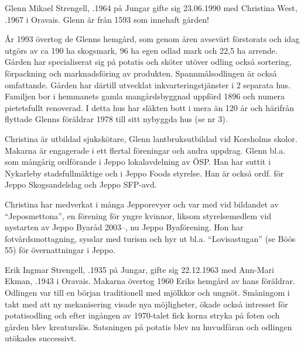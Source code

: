 
Glenn Mikael Strengell, .1964 på Jungar gifte sig 23.06.1990 med Christina West, .1967 i  Oravais. Glenn är  från 1593 som innehaft gården!


År 1993 övertog de Glenns hemgård, som genom åren avsevärt förstorats och idag utgörs av ca 190 ha skogsmark, 96 ha egen odlad mark och 22,5 ha arrende. Gården har specialiserat sig på potatis och sköter utöver odling också sortering, förpackning och marknadsföring av produkten. Spannmålsodlingen är också omfattande. Gården har därtill utvecklat inkvarteringstjänster i 2 separata hus. Familjen bor i hemmanets gamla mangårdsbyggnad uppförd 1896 och numera pietetsfullt renoverad. I detta hus har släkten bott i mera än 120 år och härifrån flyttade Glenns föräldrar 1978 till sitt nybyggda hus (se nr 3).

Christina är utbildad sjukskötare, Glenn lantbruksutbildad vid Korsholms skolor. Makarna är engagerade i ett flertal föreningar och andra uppdrag. Glenn bl.a. som mångårig ordförande i Jeppo lokalavdelning av ÖSP. Han har suttit i Nykarleby stadsfullmäktige och i Jeppo Foods styrelse. Han är också ordf. för Jeppo Skogsandelslag och Jeppo SFP-avd.

Christina har medverkat i många Jepporevyer och var med vid bildandet av ``Jeposmettona'', en förening för yngre kvinnor, liksom styrelsemedlem vid nystarten av Jeppo Byaråd 2003--, nu Jeppo Byaförening. Hon har fotvårdsmottagning, sysslar med turism och hyr ut bl.a. ``Lovisastugan'' (se Böös 55) för övernattningar i Jeppo.
\begin{jhchildren}
  \item {}
  \item {}
  \item {}
  \item {}
\end{jhchildren}


Erik Ingmar Strengell, .1935 på Jungar, gifte sig 22.12.1963 med Ann-Mari Ekman, .1943 i Oravais. Makarna övertog 1960 Eriks hemgård av hans föräldrar. Odlingen var till en början traditionell med mjölkkor och ungnöt. Småningom i takt med att ny mekanisering visade nya möjligheter, ökade också intresset för potatisodling och efter ingången av 1970-talet fick korna stryka på foten och gården blev kreaturslös. Satsningen på potatis blev nu huvudfåran och odlingen utökades successivt.

